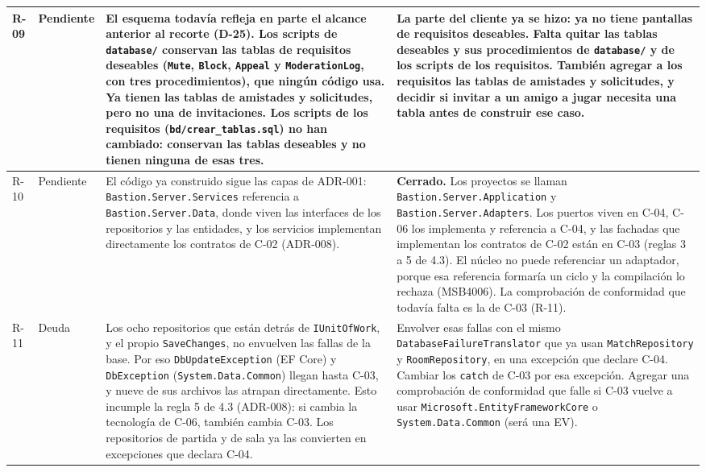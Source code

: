 \documentclass[11pt,letterpaper]{article}
\begin{document}
\begin{xltabular}{\linewidth}{|p{1.4cm}|p{2.8cm}|Y|Y|}
  R-09 & Pendiente & El esquema todavía refleja en parte el alcance anterior al recorte (D-25). Los scripts de \texttt{database/} conservan las tablas de requisitos deseables (\texttt{Mute}, \texttt{Block}, \texttt{Appeal} y \texttt{Moderation\allowbreak Log}, con tres procedimientos), que ningún código usa. Ya tienen las tablas de amistades y solicitudes, pero no una de invitaciones. Los scripts de los requisitos (\texttt{bd/\allowbreak crear\_tablas.sql}) no han cambiado: conservan las tablas deseables y no tienen ninguna de esas tres. & La parte del cliente ya se hizo: ya no tiene pantallas de requisitos deseables. Falta quitar las tablas deseables y sus procedimientos de \texttt{database/} y de los scripts de los requisitos. También agregar a los requisitos las tablas de amistades y solicitudes, y decidir si invitar a un amigo a jugar necesita una tabla antes de construir ese caso.\\\hline
  R-10 & Pendiente & El código ya construido sigue las capas de ADR-001: \texttt{Bastion.Server.Services} referencia a \texttt{Bastion.Server.Data}, donde viven las interfaces de los repositorios y las entidades, y los servicios implementan directamente los contratos de C-02 (ADR-008). & \textbf{Cerrado.} Los proyectos se llaman \texttt{Bastion.\allowbreak Server.\allowbreak Application} y \texttt{Bastion.\allowbreak Server.\allowbreak Adapters}. Los puertos viven en C-04, C-06 los implementa y referencia a C-04, y las fachadas que implementan los contratos de C-02 están en C-03 (reglas 3 a 5 de 4.3). El núcleo no puede referenciar un adaptador, porque esa referencia formaría un ciclo y la compilación lo rechaza (MSB4006). La comprobación de conformidad que todavía falta es la de C-03 (R-11).\\\hline
  R-11 & Deuda & Los ocho repositorios que están detrás de \texttt{IUnitOf\allowbreak Work}, y el propio \texttt{SaveChanges}, no envuelven las fallas de la base. Por eso \texttt{DbUpdate\allowbreak Exception} (EF Core) y \texttt{DbException} (\texttt{System.\allowbreak Data.\allowbreak Common}) llegan hasta C-03, y nueve de sus archivos las atrapan directamente. Esto incumple la regla 5 de 4.3 (ADR-008): si cambia la tecnología de C-06, también cambia C-03. Los repositorios de partida y de sala ya las convierten en excepciones que declara C-04. & Envolver esas fallas con el mismo \texttt{Database\allowbreak Failure\allowbreak Translator} que ya usan \texttt{Match\allowbreak Repository} y \texttt{Room\allowbreak Repository}, en una excepción que declare C-04. Cambiar los \texttt{catch} de C-03 por esa excepción. Agregar una comprobación de conformidad que falle si C-03 vuelve a usar \texttt{Microsoft.\allowbreak Entity\allowbreak Framework\allowbreak Core} o \texttt{System.\allowbreak Data.\allowbreak Common} (será una EV).\\\hline

\end{xltabular}
\end{document}
